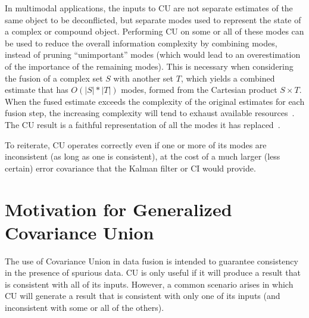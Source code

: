 In multimodal applications, the inputs to CU are not separate estimates of the same object to be deconflicted, but
separate modes used to represent the state of a complex or compound object. Performing CU on some or all of these modes
can be used to reduce the overall information complexity by combining modes, instead of pruning ``unimportant'' modes
(which would lead to an overestimation of the importance of the remaining modes).
This is necessary when considering the fusion of a complex set $S$ with another set $T$, which yields a combined
estimate that has $O(|S|*|T|)$ modes, formed from the Cartesian product $S\times T$. When the fused estimate exceeds the
complexity of the original estimates for each fusion step, the increasing complexity will tend to exhaust available
resources~\cite{fusion06}. The CU result is a faithful representation of all the modes it has replaced~\cite{uhlmann03}.

To reiterate, CU operates correctly even if one or more of its modes are inconsistent (as long as one is consistent), at
the cost of a much larger (less certain) error covariance that the Kalman filter or CI would provide.


\section{Motivation for Generalized Covariance Union}\label{section:motivation}

The use of Covariance Union in data fusion is intended to guarantee consistency in the presence of spurious
data. CU is only useful if it will produce a result that is consistent with all of its inputs. However, a common
scenario arises in which CU will generate a result that is consistent with only one of its inputs (and inconsistent with
some or all of the others).

